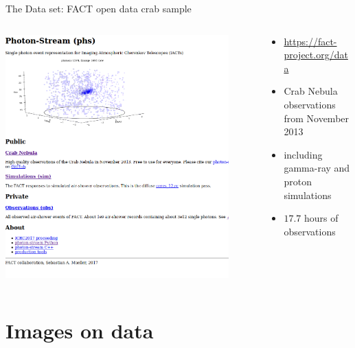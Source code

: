 \begin{frame}[t]{The Data set: FACT open data crab sample}
\begin{columns}[onlytextwidth]
    \begin{column}{0.475\textwidth}
        \includegraphics[width=0.9\textwidth]{fig/open.png}
    \end{column}
    \begin{column}{0.475\textwidth}
    \vspace*{\fill}
        \begin{itemize}
            \item \url{https://fact-project.org/data}
            \item Crab Nebula observations from November 2013
            \item including gamma-ray and proton simulations
            \item $17.7$ hours of observations
        \end{itemize}
    \end{column}
\end{columns}
\end{frame}

\section{Images on data}

